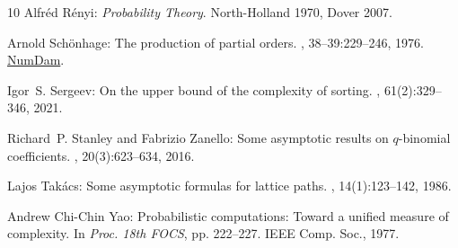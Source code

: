 \begin{thebibliography}{10}
{\sc Alfr\'ed R\'enyi}: {\em Probability Theory}.
\newblock North-Holland 1970, Dover 2007.

{\sc Arnold Sch\"onhage}: The production of partial orders.
, 38--39:229--246, 1976.
\newblock
  \href{http://www.numdam.org/book-part/AST\_1976\_\_38-39\_\_229\_0/}{NumDam}.

{\sc Igor~S. Sergeev}: On the upper bound of the complexity of sorting.
, 61(2):329--346, 2021.
\newblock [\epfmtdoi{10.1134/S0965542521020111}]

{\sc Richard~P. Stanley and Fabrizio Zanello}: Some asymptotic results on
  $q$-binomial coefficients.
, 20(3):623--634, 2016.
\newblock [\epfmtdoi{10.1007/s00026-016-0319-8}]

{\sc Lajos Tak\'{a}cs}: Some asymptotic formulas for lattice paths.
, 14(1):123--142, 1986.
\newblock [\epfmtdoi{10.1016/0378-3758(86)90016-9}]

{\sc Andrew Chi-Chin Yao}: Probabilistic computations: Toward a unified measure
  of complexity.
\newblock In {\em Proc. 18th FOCS}, pp. 222--227. IEEE Comp. Soc., 1977.

\end{thebibliography}